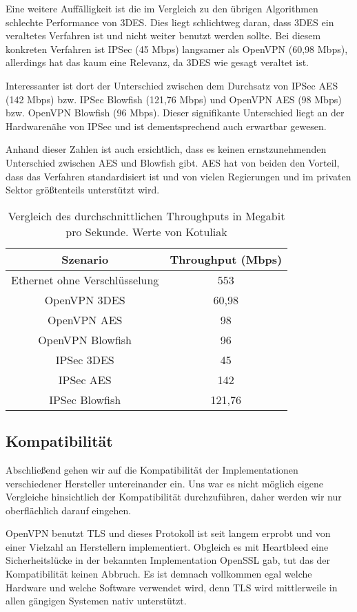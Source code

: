 \documentclass[12pt]{scrartcl}
\begin{document}
Eine weitere Auffälligkeit ist die im Vergleich zu den übrigen Algorithmen schlechte Performance von 3DES. Dies liegt schlichtweg daran, dass 3DES ein veraltetes Verfahren ist und nicht weiter benutzt werden sollte. Bei diesem konkreten Verfahren ist IPSec (45 Mbps) langsamer als OpenVPN (60,98 Mbps), allerdings hat das kaum eine Relevanz, da 3DES wie gesagt veraltet ist.

Interessanter ist dort der Unterschied zwischen dem Durchsatz von IPSec AES (142 Mbps) bzw. IPSec Blowfish (121,76 Mbps) und OpenVPN AES (98 Mbps) bzw. OpenVPN Blowfish (96 Mbps). Dieser signifikante Unterschied liegt an der Hardwarenähe von IPSec und ist dementsprechend auch erwartbar gewesen.

Anhand dieser Zahlen ist auch ersichtlich, dass es keinen ernstzunehmenden Unterschied zwischen AES und Blowfish gibt. AES hat von beiden den Vorteil, dass das Verfahren standardisiert ist und von vielen Regierungen und im privaten Sektor größtenteils unterstützt wird.

\begin{table}
\caption{Vergleich des durchschnittlichen Throughputs in Megabit pro Sekunde. Werte von Kotuliak\cite{Kotuliak2011}}
\label{tab:tp}
\begin{tabular}{c|c}
Szenario & Throughput (Mbps) \\
\hline
Ethernet ohne Verschlüsselung & 553 \\
OpenVPN 3DES & 60,98 \\
OpenVPN AES & 98 \\
OpenVPN Blowfish & 96 \\
IPSec 3DES & 45 \\
IPSec AES & 142 \\
IPSec Blowfish & 121,76
\end{tabular}
\end{table}
\subsection{Kompatibilität}
Abschließend gehen wir auf die Kompatibilität der Implementationen verschiedener Hersteller untereinander ein. Uns war es nicht möglich eigene Vergleiche hinsichtlich der Kompatibilität durchzuführen, daher werden wir nur oberflächlich darauf eingehen.

OpenVPN benutzt TLS und dieses Protokoll ist seit langem erprobt und von einer Vielzahl an Herstellern implementiert. Obgleich es mit Heartbleed eine Sicherheitslücke in der bekannten Implementation OpenSSL gab, tut das der Kompatibilität keinen Abbruch. Es ist demnach vollkommen egal welche Hardware und welche Software verwendet wird, denn TLS wird mittlerweile in allen gängigen Systemen nativ unterstützt.
\end{document}

